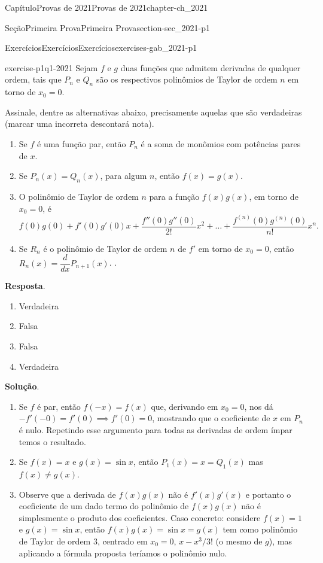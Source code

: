 \documentclass[oneside,10pt,]{book}
\newcommand{\blocktitlefont}{\relax}
\numberwithin{equation}{section}
\begin{document}
\begin{chapterptx}{Capítulo}{Provas de 2021}{}{Provas de 2021}{}{}{chapter-ch_2021}
\begin{sectionptx}{Seção}{Primeira Prova}{}{Primeira Prova}{}{}{section-sec_2021-p1}
\begin{exercises-subsection-numberless}{Exercícios}{Exercícios}{}{Exercícios}{}{}{exercises-gab_2021-p1}
\begin{divisionexercise}{1}{}{}{exercise-p1q1-2021}
Sejam \(f\) e \(g\) duas funções que admitem derivadas de qualquer ordem, tais que \(P_n\) e \(Q_n\) são os respectivos polinômios de Taylor de ordem \(n\) em torno de \(x_0=0\).%
\par
Assinale, dentre as alternativas abaixo, precisamente aquelas que são verdadeiras (marcar uma incorreta descontará nota).%
\begin{enumerate}[label=\alph*]
\item{}Se \(f\) é uma função par, então \(P_n\) é a soma de monômios com potências pares de \(x\).%
\item{}Se \(P_n(x)=Q_n(x)\), para algum \(n\), então \(f(x)=g(x)\).%
\item{}O polinômio de Taylor de ordem \(n\) para a função \(f(x)g(x)\), em torno de \(x_0=0\), é%
\begin{equation*}
f(0)g(0)+f'(0)g'(0)x+\dfrac{f''(0)g''(0)}{2!}x^2+\ldots+
\dfrac{f^{(n)}(0)g^{(n)}(0)}{n!}x^n.
\end{equation*}
%
\item{}Se \(R_n\) é o polinômio de Taylor de ordem \(n\) de \(f'\) em torno de \(x_0=0\), então \(R_n(x)=\dfrac{d}{dx}P_{n+1}(x)\).%
.\end{enumerate}
%
\par\smallskip%
\noindent\textbf{\blocktitlefont Resposta}.\hypertarget{answer-p1q1-2021-b}{}\quad{}%
\begin{enumerate}[label=\alph*]
\item{}Verdadeira%
\item{}Falsa%
\item{}Falsa%
\item{}Verdadeira%
\end{enumerate}
%
\par\smallskip%
\noindent\textbf{\blocktitlefont Solução}.\hypertarget{solution-p1q1-2021-c}{}\quad{}%
\begin{enumerate}[label=\alph*]
\item{}Se \(f\) é par, então \(f(-x)=f(x)\) que, derivando em \(x_0=0\), nos dá \(-f'(-0)=f'(0)\implies
f'(0)=0\), mostrando que o coeficiente de \(x\) em \(P_n\) é nulo. Repetindo esse argumento para todas as derivadas de ordem ímpar temos o resultado.%
\item{}Se \(f(x)=x\) e \(g(x)=\sin x\), então \(P_1(x)=x=Q_1(x)\) mas \(f(x)\neq g(x)\).%
\item{}Observe que a derivada de \(f(x)g(x)\) não é \(f'(x)g'(x)\) e portanto o coeficiente de um dado termo do polinômio de \(f(x)g(x)\) não é simplesmente o produto dos coeficientes. Caso concreto: considere \(f(x)=1\) e \(g(x)=\sin x\), então \(f(x)g(x)=\sin x=g(x)\) tem como polinômio de Taylor de ordem 3, centrado em \(x_0=0\), \(x-x^3/3!\) (o mesmo de \(g\)), mas aplicando a fórmula proposta teríamos o polinômio nulo.%

\end{enumerate}
\end{divisionexercise}
\end{exercises-subsection-numberless}
\end{sectionptx}
\end{chapterptx}
\end{document}

